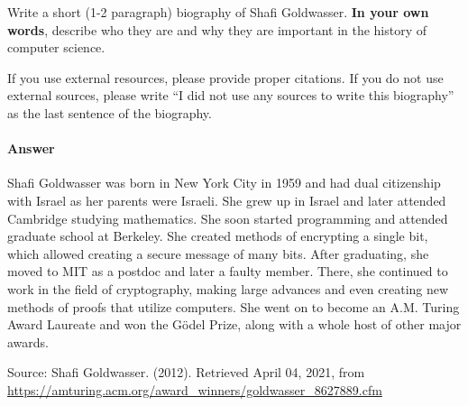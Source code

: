 \documentclass{article}
\begin{document}
\begin{enumerate}
\begin{enumerate}
\end{enumerate}


Write a short (1-2 paragraph) biography of Shafi Goldwasser.
\textbf{In your own words}, describe who they are and why they are important in
the history of computer science.

If you use external resources, please provide
proper citations. If you do not use external sources, please write ``I did not
use any sources to write this biography'' as the last sentence of the
biography.

\paragraph{Answer}

Shafi Goldwasser was born in New York City in 1959 and had dual citizenship with Israel as her parents were Israeli. She grew up in Israel and later attended Cambridge studying mathematics. She soon started programming and attended graduate school at Berkeley. She created methods of encrypting a single bit, which allowed creating a secure message of many bits. After graduating, she moved to MIT as a postdoc and later a faulty member. There, she continued to work in the field of cryptography, making large advances and even creating new methods of proofs that utilize computers. She went on to become an A.M. Turing Award Laureate and won the Gödel Prize, along with a whole host of other major awards.

Source: Shafi Goldwasser. (2012). Retrieved April 04, 2021, from \url{https://amturing.acm.org/award_winners/goldwasser_8627889.cfm}

% 
% 
\end{document}
